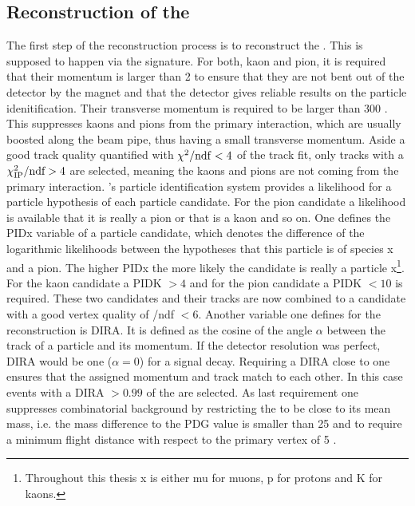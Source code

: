 \subsection{Reconstruction of the \Dz}
\label{sec:Selection_D0}
The first step of the reconstruction process is to reconstruct the \Dz.
This is supposed to happen via the \DToKpi signature.
For both, kaon and pion, it is required that their momentum is larger than 2 \gev to ensure that they are not bent out of the detector by the magnet and that the \rich detector gives reliable results on the particle idenitification.
Their transverse momentum is required to be larger than 300 \mev.
This suppresses kaons and pions from the primary interaction, which are usually boosted along the beam pipe, thus having a small transverse momentum.
Aside a good track quality quantified with $\chi^2/\mathrm{ndf} < 4$ of the track fit, only tracks with a $\chi^2_{\rm IP}/\text{ndf} > 4$ are selected, meaning the kaons and pions are not coming from the primary interaction.
\lhcb's particle identification system provides a likelihood for a particle hypothesis of each particle candidate.
For the pion candidate a likelihood is available that it is really a pion or that is a kaon and so on.
One defines the PIDx variable of a particle candidate, which denotes the difference of the logarithmic likelihoods between the hypotheses that this particle is of species x and a pion.
The higher PIDx the more likely the candidate is really a particle x\footnote{Throughout this thesis x is either mu for muons, p for protons and K for kaons.}.
For the kaon candidate a PIDK $>4$ and for the pion candidate a PIDK $<10$ is required.
These two candidates and their tracks are now combined to a \Dz candidate with a good vertex quality of \chisqvtx/ndf $<6$.
Another variable one defines for the reconstruction is DIRA.
It is defined as the cosine of the angle $\alpha$ between the track of a particle and its momentum.
If the detector resolution was perfect, DIRA would be one ($\alpha = 0$) for a signal decay.
Requiring a DIRA close to one ensures that the assigned momentum and track match to each other.
In this case events with a DIRA $>0.99$ of the \Dz are selected.
As last requirement one suppresses combinatorial background by restricting the \Dz to be close to its mean mass, i.e. the mass difference to the PDG value is smaller than 25 \mev and to require a minimum \Dz flight distance with respect to the primary vertex of 5 \mm.

